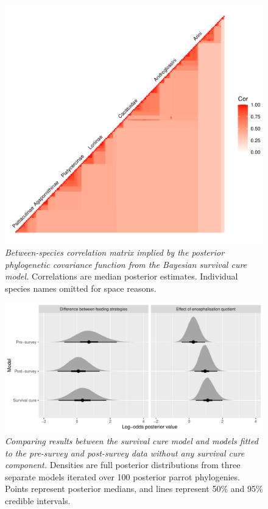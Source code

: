 \documentclass[
  man, donotrepeattitle,floatsintext]{apa6}
\begin{document}
\newpage



\begin{figure}
\centering
\includegraphics{manuscript_files/figure-latex/plotSurvCure6-1.pdf}
\caption{\label{fig:plotSurvCure6}\emph{Between-species correlation matrix implied by the posterior phylogenetic covariance function from the Bayesian survival cure model.} Correlations are median posterior estimates. Individual species names omitted for space reasons.}
\end{figure}

\newpage



\begin{figure}
\centering
\includegraphics{figures/comparison.pdf}
\caption{\label{fig:plotComparison}\emph{Comparing results between the survival cure model and models fitted to the pre-survey and post-survey data without any survival cure component.} Densities are full posterior distributions from three separate models iterated over 100 posterior parrot phylogenies. Points represent posterior medians, and lines represent 50\% and 95\% credible intervals.}
\end{figure}
\end{document}

